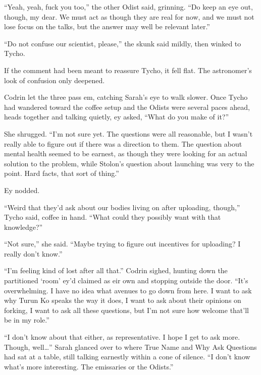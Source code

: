 ``Yeah, yeah, fuck you too,'' the other Odist said, grinning. ``Do keep an eye out, though, my dear. We must act as though they are real for now, and we must not lose focus on the talks, but the answer may well be relevant later.''

``Do not confuse our scientist, please,'' the skunk said mildly, then winked to Tycho.

If the comment had been meant to reassure Tycho, it fell flat. The astronomer's look of confusion only deepened.

Codrin let the three pass em, catching Sarah's eye to walk slower. Once Tycho had wandered toward the coffee setup and the Odists were several paces ahead, heads together and talking quietly, ey asked, ``What do you make of it?''

She shrugged. ``I'm not sure yet. The questions were all reasonable, but I wasn't really able to figure out if there was a direction to them. The question about mental health seemed to be earnest, as though they were looking for an actual solution to the problem, while Stolon's question about launching was very to the point. Hard facts, that sort of thing.''

Ey nodded.

``Weird that they'd ask about our bodies living on after uploading, though,'' Tycho said, coffee in hand. ``What could they possibly want with that knowledge?''

``Not sure,'' she said. ``Maybe trying to figure out incentives for uploading? I really don't know.''

``I'm feeling kind of lost after all that.'' Codrin sighed, hunting down the partitioned `room' ey'd claimed as eir own and stopping outside the door. ``It's overwhelming. I have no idea what avenues to go down from here. I want to ask why Turun Ko speaks the way it does, I want to ask about their opinions on forking, I want to ask all these questions, but I'm not sure how welcome that'll be in my role.''

``I don't know about that either, as representative. I hope I get to ask more. Though, well\ldots{}'' Sarah glanced over to where True Name and Why Ask Questions had sat at a table, still talking earnestly within a cone of silence. ``I don't know what's more interesting. The emissaries or the Odists.''
